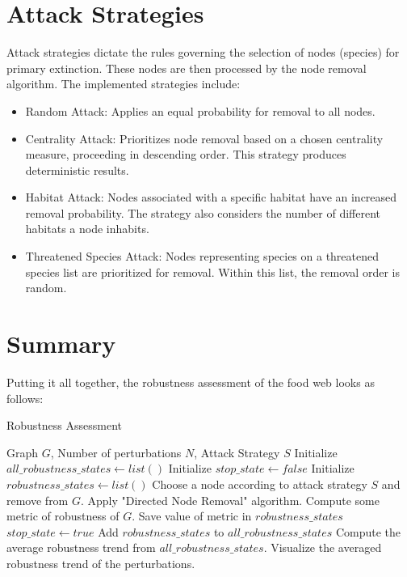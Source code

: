 \documentclass[a4paper, 12pt]{report}
\begin{document}
\section{Attack Strategies}
Attack strategies dictate the rules governing the selection of nodes (species) for primary extinction. These nodes are then processed by the node removal algorithm. The implemented strategies include:

\begin{itemize}
\item Random Attack: Applies an equal probability for removal to all nodes.
\item Centrality Attack: Prioritizes node removal based on a chosen centrality measure, proceeding in descending order. This strategy produces deterministic results.
\item Habitat Attack: Nodes associated with a specific habitat have an increased removal probability. The strategy also considers the number of different habitats a node inhabits.
\item Threatened Species Attack: Nodes representing species on a threatened species list are prioritized for removal. Within this list, the removal order is random.
\end{itemize}

\section{Summary}

Putting it all together, the robustness assessment of the food web looks as follows:

\begin{minipage}{\textwidth}
\begin{algorithm}[H]
    \caption{Robustness Assessment}
    \begin{algorithmic}[1]
    \small
    \Require Graph $G$, Number of perturbations $N$, Attack Strategy $S$
    \State Initialize $all\_robustness\_states \gets list()$
    \State Initialize $stop\_state \gets false$
    \State Initialize $robustness\_states \gets list()$
    \State Choose a node according to attack strategy $S$ and remove from $G$.
    \State Apply "Directed Node Removal" algorithm.
    \State Compute some metric of robustness of $G$.
    \State Save value of metric in $robustness\_states$
    \State $stop\_state \gets true$
    \EndIf
    \EndWhile
    \State Add $robustness\_states$ to $all\_robustness\_states$
    \EndFor
    \State Compute the average robustness trend from $all\_robustness\_states$.
    \State Visualize the averaged robustness trend of the perturbations.
    \end{algorithmic}
\end{algorithm}
\end{minipage}
\end{document}
